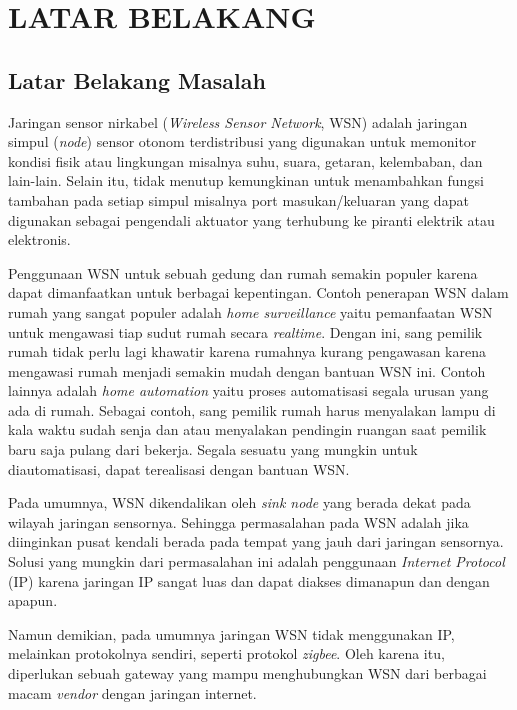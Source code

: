 
\chapter{LATAR BELAKANG}

\section{Latar Belakang Masalah}
Jaringan sensor nirkabel (\emph{Wireless Sensor Network}, WSN) adalah jaringan simpul (\emph{node}) sensor otonom terdistribusi yang digunakan untuk memonitor kondisi fisik atau lingkungan misalnya suhu, suara, getaran, kelembaban, dan lain-lain. Selain itu, tidak menutup kemungkinan untuk menambahkan fungsi tambahan pada setiap simpul misalnya port masukan/keluaran yang dapat digunakan sebagai pengendali aktuator yang terhubung ke piranti elektrik atau elektronis.

Penggunaan WSN untuk sebuah gedung dan rumah semakin populer karena dapat dimanfaatkan untuk berbagai kepentingan. Contoh penerapan WSN dalam rumah yang sangat populer adalah \emph{home surveillance} yaitu pemanfaatan WSN untuk mengawasi tiap sudut rumah secara \emph{realtime}. Dengan ini, sang pemilik rumah tidak perlu lagi khawatir karena rumahnya kurang pengawasan karena mengawasi rumah menjadi semakin mudah dengan bantuan WSN ini. Contoh lainnya adalah \emph{home automation} yaitu proses automatisasi segala urusan yang ada di rumah. Sebagai contoh, sang pemilik rumah harus menyalakan lampu di kala waktu sudah senja dan atau menyalakan pendingin ruangan saat pemilik baru saja pulang dari bekerja. Segala sesuatu yang mungkin untuk diautomatisasi, dapat terealisasi dengan bantuan WSN.

Pada umumnya, WSN dikendalikan oleh \emph{sink node} yang berada dekat pada wilayah jaringan sensornya. Sehingga permasalahan pada WSN adalah jika diinginkan pusat kendali berada pada tempat yang jauh dari jaringan sensornya. Solusi yang mungkin dari permasalahan ini adalah penggunaan \emph{Internet Protocol} (IP) karena jaringan IP sangat luas dan dapat diakses dimanapun dan dengan apapun.

Namun demikian, pada umumnya jaringan WSN tidak menggunakan IP, melainkan protokolnya sendiri, seperti protokol \emph{zigbee}. Oleh karena itu, diperlukan sebuah gateway yang mampu menghubungkan WSN dari berbagai macam \emph{vendor} dengan jaringan internet.


